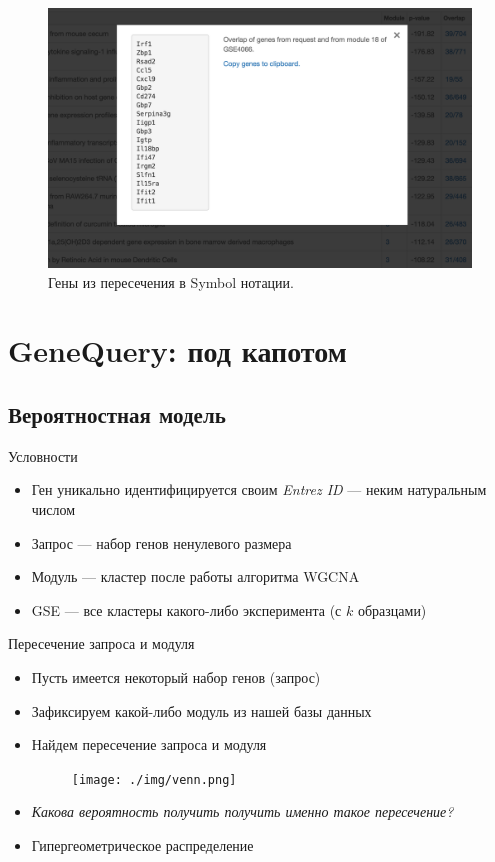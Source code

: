 \documentclass[10pt,pdf,utf8,russian,aspectratio=169]{beamer}
\begin{document}
\begin{frame}
    \begin{figure}[p]
        \centering
        \caption{Гены из пересечения в Symbol нотации.}
        \includegraphics[height=0.9\textheight]{./img/screen_overlap.png}
    \end{figure}
\end{frame}


\section{GeneQuery: под капотом}

\subsection{Вероятностная модель}

\begin{frame}{Условности}
  \begin{itemize}[<+->]
    \item Ген уникально идентифицируется своим \emph{Entrez ID} --- неким натуральным числом
    \item Запрос --- набор генов ненулевого размера
    \item Модуль --- кластер после работы алгоритма WGCNA
    \item GSE --- все кластеры какого-либо эксперимента (с $k$ образцами)
  \end{itemize}
\end{frame}

\begin{frame}{Пересечение запроса и модуля}
  \begin{itemize}[<+->]
    \item Пусть имеется некоторый набор генов (запрос)
    \item Зафиксируем какой-либо модуль из нашей базы данных
    \item Найдем пересечение запроса и модуля
    \begin{figure}[ht]
        \centering
        \texttt{[image: ./img/venn.png]}
    \end{figure}
    \item \emph{Какова вероятность получить получить именно такое пересечение?}
    \item Гипергеометрическое распределение
  \end{itemize}
\end{frame}
\end{document}
